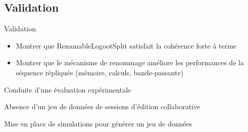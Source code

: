 \subsection{Validation}

\begin{frame}{Validation}
  \begin{itemize}
    \item \alert{Montrer que RenamableLogootSplit satisfait la cohérence forte à terme}
    \item \alert{Montrer que le mécanisme de renommage améliore les performances} de la séquence répliquée (mémoire, calculs, bande-passante)
  \end{itemize}
  \pause
  \begin{center}
    \alert{Conduite d'une évaluation expérimentale}
  \end{center}
\end{frame}

\begin{frame}[standout]
  \alert{Absence d'un jeu de données de sessions d'édition collaborative}

  \medskip
  \pause
  Mise en place de simulations pour générer un jeu de données
\end{frame}

